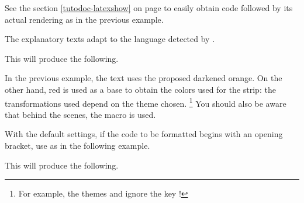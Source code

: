 



\smallskip

\begin{tdocrem}
    See the section \ref{tutodoc-latexshow} on page \pageref{tutodoc-latexshow} to easily obtain code followed by its actual rendering as in the previous example.
\end{tdocrem}


\begin{tdocnote}
    The explanatory texts adapt to the language detected by \thisproj.
\end{tdocnote}




\begin{tdocexa}
    \leavevmode



    This will produce the following.

    \medskip

    

\end{tdocexa}


\begin{tdocnote}
    In the previous example, the text uses the proposed darkened orange. On the other hand, red is used as a base to obtain the colors used for the strip: the transformations used depend on the theme chosen.%
    \footnote{
        For example, the themes  and  ignore the key !
    }
    You should also be aware that behind the scenes, the macro  is used.

    \begin{tdoclatex}[std]
    \end{tdoclatex}
\end{tdocnote}




\begin{tdocwarn}
    With the default settings, if the code to be formatted begins with an opening bracket, use  as in the following example.



    This will produce the following.
\end{tdocwarn}


